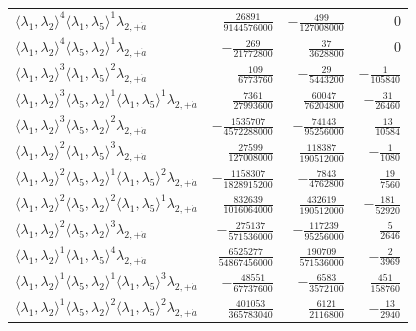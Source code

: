 \begin{longtable}{@{}lrrr@{}}
$\langle\lambda_1,\lambda_2\rangle^{4}\langle\lambda_1,\lambda_5\rangle^{1}\lambda_{2,+\dot a}$ & $\frac{26891}{9144576000}$ & $-\frac{499}{127008000}$ & $0$ \\
$\langle\lambda_1,\lambda_2\rangle^{4}\langle\lambda_5,\lambda_2\rangle^{1}\lambda_{2,+\dot a}$ & $-\frac{269}{21772800}$ & $\frac{37}{3628800}$ & $0$ \\
$\langle\lambda_1,\lambda_2\rangle^{3}\langle\lambda_1,\lambda_5\rangle^{2}\lambda_{2,+\dot a}$ & $\frac{109}{6773760}$ & $-\frac{29}{5443200}$ & $-\frac{1}{105840}$ \\
$\langle\lambda_1,\lambda_2\rangle^{3}\langle\lambda_5,\lambda_2\rangle^{1}\langle\lambda_1,\lambda_5\rangle^{1}\lambda_{2,+\dot a}$ & $\frac{7361}{27993600}$ & $\frac{60047}{76204800}$ & $-\frac{31}{26460}$ \\
$\langle\lambda_1,\lambda_2\rangle^{3}\langle\lambda_5,\lambda_2\rangle^{2}\lambda_{2,+\dot a}$ & $-\frac{1535707}{4572288000}$ & $-\frac{74143}{95256000}$ & $\frac{13}{10584}$ \\
$\langle\lambda_1,\lambda_2\rangle^{2}\langle\lambda_1,\lambda_5\rangle^{3}\lambda_{2,+\dot a}$ & $\frac{27599}{127008000}$ & $\frac{118387}{190512000}$ & $-\frac{1}{1080}$ \\
$\langle\lambda_1,\lambda_2\rangle^{2}\langle\lambda_5,\lambda_2\rangle^{1}\langle\lambda_1,\lambda_5\rangle^{2}\lambda_{2,+\dot a}$ & $-\frac{1158307}{1828915200}$ & $-\frac{7843}{4762800}$ & $\frac{19}{7560}$ \\
$\langle\lambda_1,\lambda_2\rangle^{2}\langle\lambda_5,\lambda_2\rangle^{2}\langle\lambda_1,\lambda_5\rangle^{1}\lambda_{2,+\dot a}$ & $\frac{832639}{1016064000}$ & $\frac{432619}{190512000}$ & $-\frac{181}{52920}$ \\
$\langle\lambda_1,\lambda_2\rangle^{2}\langle\lambda_5,\lambda_2\rangle^{3}\lambda_{2,+\dot a}$ & $-\frac{275137}{571536000}$ & $-\frac{117239}{95256000}$ & $\frac{5}{2646}$ \\
$\langle\lambda_1,\lambda_2\rangle^{1}\langle\lambda_1,\lambda_5\rangle^{4}\lambda_{2,+\dot a}$ & $\frac{6525277}{54867456000}$ & $\frac{190709}{571536000}$ & $-\frac{2}{3969}$ \\
$\langle\lambda_1,\lambda_2\rangle^{1}\langle\lambda_5,\lambda_2\rangle^{1}\langle\lambda_1,\lambda_5\rangle^{3}\lambda_{2,+\dot a}$ & $-\frac{48551}{67737600}$ & $-\frac{6583}{3572100}$ & $\frac{451}{158760}$ \\
$\langle\lambda_1,\lambda_2\rangle^{1}\langle\lambda_5,\lambda_2\rangle^{2}\langle\lambda_1,\lambda_5\rangle^{2}\lambda_{2,+\dot a}$ & $\frac{401053}{365783040}$ & $\frac{6121}{2116800}$ & $-\frac{13}{2940}$ \\

\end{longtable}
